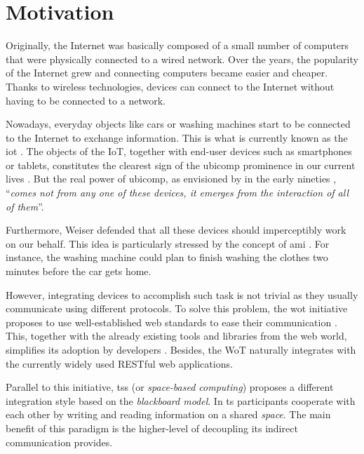 \section{Motivation}
\label{sec:Motivation}

Originally, the Internet was basically composed of a small number of computers that were physically connected to a wired network.
Over the years, the popularity of the Internet grew and connecting computers became easier and cheaper.
Thanks to wireless technologies, devices can connect to the Internet without having to be connected to a network.

Nowadays, everyday objects like cars or washing machines start to be connected to the Internet to exchange information.
This is what is currently known as the \ac{iot} \citep{atzori_internet_2010}.
The objects of the IoT, together with end-user devices such as smartphones or tablets, constitutes the clearest sign of the \acf{ubicomp} prominence in our current lives \citep{caceres_ubicomp_2012}.
But the real power of \ac{ubicomp}, as envisioned by \citeauthor{weiser1991computer} in the early nineties \citep{weiser1991computer}, ``\emph{comes not from any one of these devices, it emerges from the interaction of all of them}''.

Furthermore, Weiser defended that all these devices should imperceptibly work on our behalf.
This idea is particularly stressed by the concept of \ac{ami} \citep{ramos_ambient_2008}.
For instance, the washing machine could plan to finish washing the clothes two minutes before the car gets home.

\medskip

However, integrating devices to accomplish such task is not trivial as they usually communicate using different protocols.
To solve this problem, the \ac{wot} initiative proposes to use well-established web standards to ease their communication \citep{guinard_thesis_2011}.
This, together with the already existing tools and libraries from the web world, simplifies its adoption by developers \citep{guinard_search_2011}.
Besides, the WoT naturally integrates with the currently widely used RESTful web applications.

Parallel to this initiative, \aclp{ts} (or \emph{space-based computing}) \citep{gelernter_generative_1985} proposes a different integration style based on the \emph{blackboard model}.
In \ac{ts} participants cooperate with each other by writing and reading information on a shared \emph{space}.
The main benefit of this paradigm is the higher-level of decoupling its indirect communication provides. %

